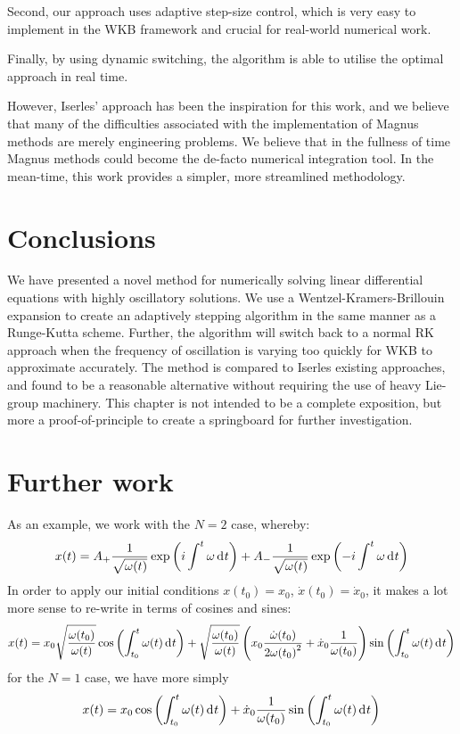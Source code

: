 Second, our approach uses adaptive step-size control, which is very easy to implement in the WKB framework and crucial for real-world numerical work.

Finally, by using dynamic switching, the algorithm is able to utilise the optimal approach in real time.

However, Iserles' approach has been the inspiration for this work, and we believe that many of the difficulties associated with the implementation of Magnus methods are merely engineering problems. We believe that in the fullness of time Magnus methods could become the de-facto numerical integration tool. In the mean-time, this work provides a simpler, more streamlined methodology.


\section{Conclusions}



We have presented a novel method for numerically solving linear differential equations with highly oscillatory solutions. We use a Wentzel-Kramers-Brillouin expansion to create an adaptively stepping algorithm in the same manner as a Runge-Kutta scheme. Further, the algorithm will switch back to a normal RK approach when the frequency of oscillation is varying too quickly for WKB to approximate accurately. The method is compared to Iserles existing approaches, and found to be a reasonable alternative without requiring the use of heavy Lie-group machinery. This chapter is not intended to be a complete exposition, but more a proof-of-principle to create a springboard for further investigation.


\section{Further work}
As an example, we work with the \(N=2\) case, whereby:
\begin{equation}
    x(t) = A_+ \frac{1}{\sqrt{\omega(t)}}\exp\left( i\int^t \omega \operatorname{d}^{}\!{t} \right)  + A_- \frac{1}{\sqrt{\omega(t)}}\exp\left( -i\int^t \omega \operatorname{d}^{}\!{t} \right) 
\end{equation}
In order to apply our initial conditions \(x(t_0) = x_0\), \(\dot{x}(t_0) = \dot{x}_0\), it makes a lot more sense to re-write in terms of cosines and sines:
\begin{equation}
    x(t) = x_0 \sqrt{\frac{\omega(t_0)}{\omega(t)}} \cos\left( \int_{t_0}^{t}\omega(t)\operatorname{d}^{}\!{t} \right) + \sqrt{\frac{\omega(t_0)}{\omega(t)}} \left( x_0 \frac{\dot{\omega}(t_0)}{2{\omega(t_0)}^2} + \dot{x}_0 \frac{1}{\omega(t_0)}  \right)\sin\left( \int_{t_0}^{t}\omega(t)\operatorname{d}^{}\!{t} \right)
\end{equation}
for the \(N=1\) case, we have more simply
\begin{equation}
    x(t) = x_0 \cos\left( \int_{t_0}^{t}\omega(t)\operatorname{d}^{}\!{t} \right) + \dot{x}_0 \frac{1}{\omega(t_0)} \sin\left( \int_{t_0}^{t}\omega(t)\operatorname{d}^{}\!{t} \right)
\end{equation}

\begin{subappendices}
  
\end{subappendices}

